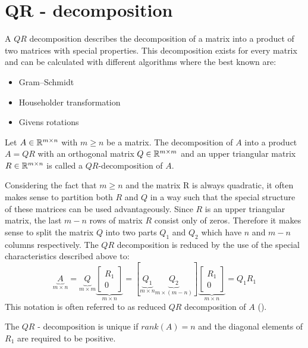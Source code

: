 \section{QR - decomposition}

A $QR$ decomposition describes the decomposition of a matrix into a product of two matrices with special properties. This decomposition exists for every matrix and can be calculated with different algorithms where the best known are:

\begin{itemize}
	\item Gram–Schmidt
	\item Householder transformation
	\item Givens rotations
\end{itemize}

\begin{definition}
	Let $A \in \mathbb{R}^{m \times n}$ with $m \geq n$ be a matrix. The decomposition of $A$ into a product $A = QR$ with an orthogonal matrix $Q \in \mathbb{R}^{m \times m}$ and an upper triangular matrix $R \in \mathbb{R}^{m \times n}$ is called a $QR$-decomposition of $A$. 
\end{definition}

Considering the fact that $m \geq n$ and the matrix R is always quadratic, it often makes sense to partition both $R$ and $Q$ in a way such that the special structure of these matrices can be used advantageously. Since $R$ is an upper triangular matrix, the last $m-n$ rows of matrix $R$ consist only of zeros. Therefore it makes sense to split the matrix $Q$ into two parts $Q_1$ and $Q_2$ which have $n$ and $m-n$ columns respectively. The $QR$ decomposition is reduced by the use of the special characteristics described above to:
\begin{equation}\label{equ:thin_QR}
	\underbrace{A}_{m \times n} =  \underbrace{Q}_{m \times m} \underbrace{\begin{bmatrix} R_1 \\ 0 \end{bmatrix}}_{m \times n} = [\underbrace{Q_1}_{m \times n} \underbrace{Q_2}_{m \times (m-n)} ]  \underbrace{\begin{bmatrix} R_1 \\ 0 \end{bmatrix}}_{m \times n} = Q_1 R_1
\end{equation}
This notation is often referred to as reduced $QR$ decomposition of $A$ (\cite{trefethen1997numerical}).

\begin{remark} The $QR$ - decomposition is unique if $rank(A) = n$ and the diagonal elements of $R_1$ are required to be positive.
\end{remark}

